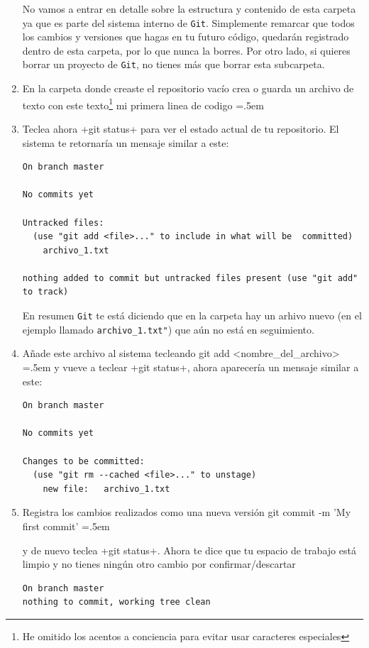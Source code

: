 \documentclass[a5paper, oneside,10pt]{article}
\newenvironment{cverbatim}
 {\SaveVerbatim{cverb}}
 {\endSaveVerbatim
  \flushleft\fboxrule=0pt\fboxsep=.5em
  \colorbox{bg}{\BUseVerbatim{cverb}}%
  \endflushleft
}
\begin{document}
\begin{enumerate}
      No vamos a entrar en detalle sobre la estructura y contenido de esta carpeta ya que es parte del sistema interno de \verb+Git+. Simplemente remarcar que todos los cambios y versiones que hagas en tu futuro código, quedarán registrado dentro de esta carpeta, por lo que nunca la borres. Por otro lado, si quieres borrar un proyecto de \verb+Git+, no tienes más que borrar esta subcarpeta.
    
    \item En la carpeta donde creaste el repositorio vacío crea o guarda un archivo de texto con este texto\footnote{He omitido los acentos a conciencia para evitar usar caracteres especiales}
    \begin{cverbatim}
mi primera linea de codigo
    \end{cverbatim}
    
    \item Teclea ahora \cverb+git status+ para ver el estado actual de tu repositorio. El sistema te retornaría un mensaje similar a este:
    
    \begin{lstlisting}[style=custom]
On branch master

No commits yet

Untracked files:
  (use "git add <file>..." to include in what will be  committed)
	archivo_1.txt

nothing added to commit but untracked files present (use "git add" to track)
    \end{lstlisting}
    En resumen \verb+Git+ te está diciendo que en la carpeta hay un arhivo nuevo (en el ejemplo llamado \verb+archivo_1.txt"+) que aún no está en seguimiento.

    \item Añade este archivo al sistema tecleando
    \begin{cverbatim}
git add <nombre_del_archivo>
    \end{cverbatim}
    y vueve a teclear \cverb+git status+, ahora aparecería un mensaje similar a este:
    
    \begin{lstlisting}[style=custom]
On branch master

No commits yet

Changes to be committed:
  (use "git rm --cached <file>..." to unstage)
	new file:   archivo_1.txt
    \end{lstlisting}

    \item Registra los cambios realizados como una nueva versión
    \begin{cverbatim}
git commit -m 'My first commit'
    \end{cverbatim}
    
    y de nuevo teclea \cverb+git status+. Ahora te dice que tu espacio de trabajo está limpio y no tienes ningún otro cambio por confirmar/descartar

    \begin{lstlisting}[style=custom]
On branch master
nothing to commit, working tree clean
    \end{lstlisting}
    
    \end{enumerate}
    
\end{document}

